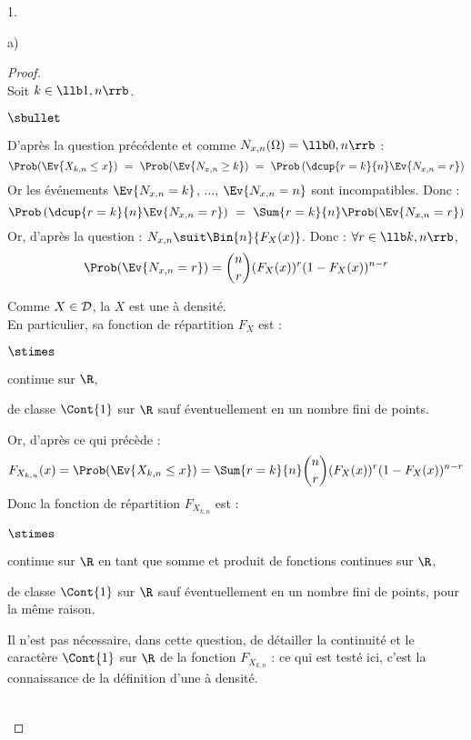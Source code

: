 \begin{noliste}{1.}
\begin{noliste}{a)}
    \begin{proof}~\\
    Soit $k \in \llb 1,n \rrb$.
    \begin{noliste}{$\sbullet$}
      \item D'après la question précédente et comme $N_{x,n}(\Omega)
      =\llb 0,n \rrb$ :
      \[
        \Prob(\Ev{X_{k,n} \leq x}) \ = \ \Prob(\Ev{N_{x,n}\geq k})
        \ = \ \Prob\left( \dcup{r=k}{n} \Ev{N_{x,n}=r}\right)
      \]
      Or les événements $\Ev{N_{x,n}=k}$, $\ldots$, 
      $\Ev{N_{x,n}=n}$ sont incompatibles. Donc :
      \[
        \Prob\left(\dcup{r=k}{n} \Ev{N_{x,n}=r}\right) 
        \ = \ \Sum{r=k}{n} \Prob(\Ev{N_{x,n}=r})
      \]
      Or, d'après la question  : $N_{x,n} \suit 
      \Bin{n}{F_X(x)}$. Donc : $\forall r \in \llb k,n \rrb$,
      \[
        \Prob(\Ev{N_{x,n}=r}) = \dbinom{n}{r} (F_X(x))^r
        (1-F_X(x))^{n-r}
      \]
      
      \item Comme $X \in {\cal D}$, la \var $X$ est une \var à 
      densité.\\
      En particulier, sa fonction de répartition $F_X$ est :
      \begin{noliste}{$\stimes$}
	\item continue sur $\R$,
	\item de classe $\Cont{1}$ sur $\R$ sauf éventuellement 
	en un nombre fini de points.
      \end{noliste}
      Or, d'après ce qui précède :
      \[
        F_{X_{k,n}}(x) = \Prob(\Ev{X_{k,n} \leq x})
        = \Sum{r=k}{n} \dbinom{n}{r} (F_X(x))^r 
        (1-F_X(x))^{n-r}
      \]
      Donc la fonction de répartition $F_{X_{k,n}}$ est :
      \begin{noliste}{$\stimes$}
	\item continue sur $\R$ en tant que somme et 
	produit de fonctions continues sur $\R$,
	\item de classe $\Cont{1}$ sur $\R$ sauf éventuellement
	en un nombre fini de points, pour la même raison.
      \end{noliste}
    \end{noliste}
    
    \begin{remark}
      Il n'est pas nécessaire, dans cette question, de détailler 
      la continuité et le caractère $\Cont{1}$ sur $\R$ de la fonction
      $F_{X_{k,n}}$ : ce qui est testé ici, c'est la connaissance de la 
      définition d'une \var à densité.
    \end{remark}~\\[-1.4cm]
    \end{proof}
  \end{noliste}


\end{noliste}
